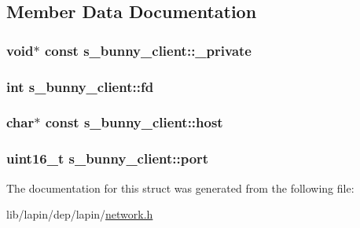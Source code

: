 \subsection{Member Data Documentation}
\hypertarget{structs__bunny__client_a88a21fe87518446a4d50a5a039f95993}{
\subsubsection[{\-\_\-private}]{ void$\ast$ {\bf const} s\-\_\-bunny\-\_\-client\-::\-\_\-private}}\label{structs__bunny__client_a88a21fe87518446a4d50a5a039f95993}
\hypertarget{structs__bunny__client_a60a49c90fc5bd5599074f569d51b3c4d}{
\subsubsection[{fd}]{ {\bf int} s\-\_\-bunny\-\_\-client\-::fd}}\label{structs__bunny__client_a60a49c90fc5bd5599074f569d51b3c4d}
\hypertarget{structs__bunny__client_abda1c49863888e4ef1c94379ba99e15c}{
\subsubsection[{host}]{ char$\ast$ {\bf const} s\-\_\-bunny\-\_\-client\-::host}}\label{structs__bunny__client_abda1c49863888e4ef1c94379ba99e15c}
\hypertarget{structs__bunny__client_af97995bf4950ecc2fba7cda85b9b4bd5}{
\subsubsection[{port}]{\setlength{\rightskip}{0pt plus 5cm}uint16\-\_\-t s\-\_\-bunny\-\_\-client\-::port}}\label{structs__bunny__client_af97995bf4950ecc2fba7cda85b9b4bd5}


The documentation for this struct was generated from the following file\-:\begin{DoxyCompactItemize}
\item 
lib/lapin/dep/lapin/\hyperlink{network_8h}{network.\-h}\end{DoxyCompactItemize}
